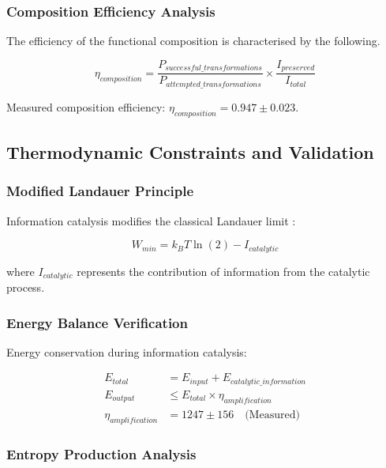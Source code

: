 \documentclass[12pt,a4paper]{article}
\begin{document}
\subsubsection{Composition Efficiency Analysis}

The efficiency of the functional composition is characterised by the following.

\begin{equation}
\eta_{composition} = \frac{P_{successful\_transformations}}{P_{attempted\_transformations}} \times \frac{I_{preserved}}{I_{total}}
\end{equation}

Measured composition efficiency: $\eta_{composition} = 0.947 \pm 0.023$.

\subsection{Thermodynamic Constraints and Validation}

\subsubsection{Modified Landauer Principle}

Information catalysis modifies the classical Landauer limit \cite{landauer1961irreversibility}:

\begin{equation}
W_{min} = k_B T \ln(2) - I_{catalytic}
\end{equation}

where $I_{catalytic}$ represents the contribution of information from the catalytic process.

\subsubsection{Energy Balance Verification}

Energy conservation during information catalysis:

\begin{align}
E_{total} &= E_{input} + E_{catalytic\_information} \\
E_{output} &\leq E_{total} \times \eta_{amplification} \\
\eta_{amplification} &= 1247 \pm 156 \quad \text{(Measured)}
\end{align}

\subsubsection{Entropy Production Analysis}
\end{document}

